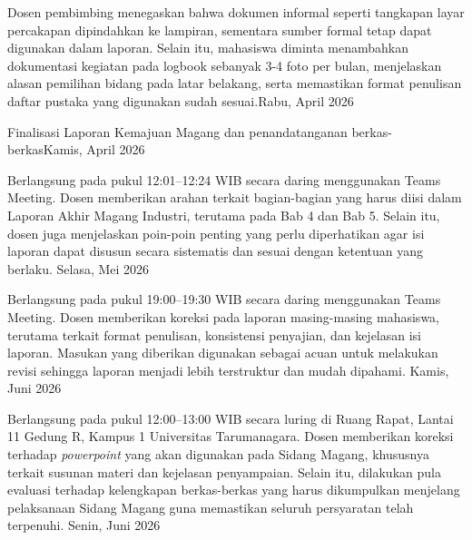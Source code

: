 \documentclass[12pt, a4paper, oneside]{report}
\begin{document}
\begin{singlespace}
\begin{dhbtable}
{            Dosen pembimbing menegaskan bahwa dokumen informal seperti tangkapan layar
            percakapan dipindahkan ke lampiran, sementara sumber formal tetap dapat
            digunakan dalam laporan. Selain itu, mahasiswa diminta menambahkan dokumentasi
            kegiatan pada logbook sebanyak 3-4 foto per bulan, menjelaskan alasan pemilihan
            bidang pada latar belakang, serta memastikan format penulisan daftar pustaka
            yang digunakan sudah sesuai.}{Rabu, April 2026}{}

         {Finalisasi
            Laporan Kemajuan Magang dan penandatanganan berkas-berkas}{Kamis, April
            2026}{}%

         {
            Berlangsung pada pukul 12:01--12:24 WIB secara daring menggunakan Teams
            Meeting. Dosen memberikan arahan terkait bagian-bagian yang harus diisi
            dalam Laporan Akhir Magang Industri, terutama pada Bab 4 dan Bab 5.
            Selain itu, dosen juga menjelaskan poin-poin penting yang perlu
            diperhatikan agar isi laporan dapat disusun secara sistematis dan sesuai
            dengan ketentuan yang berlaku.
        }{Selasa, Mei 2026}{}

         {
            Berlangsung pada pukul 19:00--19:30 WIB secara daring menggunakan Teams
            Meeting. Dosen memberikan koreksi pada laporan masing-masing mahasiswa,
            terutama terkait format penulisan, konsistensi penyajian, dan kejelasan
            isi laporan. Masukan yang diberikan digunakan sebagai acuan untuk
            melakukan revisi sehingga laporan menjadi lebih terstruktur dan mudah
            dipahami.
        }{Kamis, Juni 2026}{}

         {
            Berlangsung pada pukul 12:00--13:00 WIB secara luring di Ruang Rapat,
            Lantai 11 Gedung R, Kampus 1 Universitas Tarumanagara. Dosen memberikan
            koreksi terhadap \textit{powerpoint} yang akan digunakan pada Sidang
            Magang, khususnya terkait susunan materi dan kejelasan penyampaian.
            Selain itu, dilakukan pula evaluasi terhadap kelengkapan berkas-berkas
            yang harus dikumpulkan menjelang pelaksanaan Sidang Magang guna memastikan
            seluruh persyaratan telah terpenuhi.
        }{Senin, Juni 2026}{}

    \end{dhbtable}
\end{singlespace}
\end{document}
